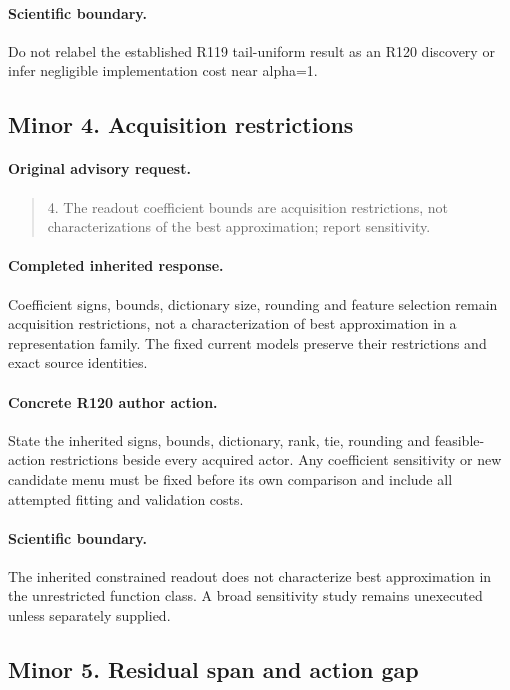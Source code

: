 \paragraph{Scientific boundary.}
Do not relabel the established R119 tail-uniform result as an R120 discovery or infer negligible implementation cost near alpha=1.

\subsection{Minor 4. Acquisition restrictions}
\label{response120:minor-4}
\paragraph{Original advisory request.}
\begin{quote}
4. The readout coefficient bounds are acquisition restrictions, not characterizations of the best approximation; report sensitivity.
\end{quote}
\paragraph{Completed inherited response.}
Coefficient signs, bounds, dictionary size, rounding and feature selection remain acquisition restrictions, not a characterization of best approximation in a representation family. The fixed current models preserve their restrictions and exact source identities.
\paragraph{Concrete R120 author action.}
State the inherited signs, bounds, dictionary, rank, tie, rounding and feasible-action restrictions beside every acquired actor. Any coefficient sensitivity or new candidate menu must be fixed before its own comparison and include all attempted fitting and validation costs.
\paragraph{Scientific boundary.}
The inherited constrained readout does not characterize best approximation in the unrestricted function class. A broad sensitivity study remains unexecuted unless separately supplied.

\subsection{Minor 5. Residual span and action gap}
\label{response120:minor-5}
